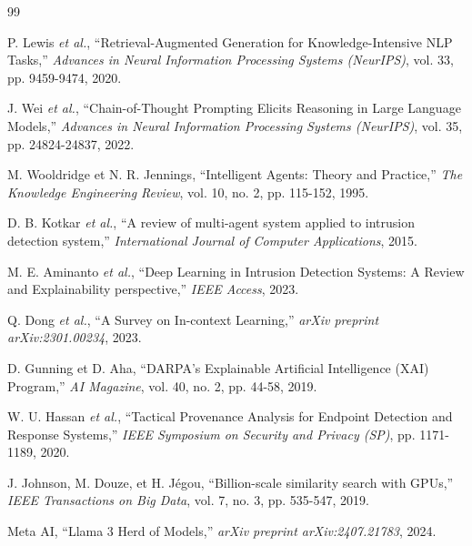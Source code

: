 \documentclass[a4paper, 12pt]{report}
\begin{document}
\begin{thebibliography}{99}


P. Lewis \textit{et al.}, ``Retrieval-Augmented Generation for Knowledge-Intensive NLP Tasks,'' \textit{Advances in Neural Information Processing Systems (NeurIPS)}, vol. 33, pp. 9459-9474, 2020.

J. Wei \textit{et al.}, ``Chain-of-Thought Prompting Elicits Reasoning in Large Language Models,'' \textit{Advances in Neural Information Processing Systems (NeurIPS)}, vol. 35, pp. 24824-24837, 2022.

M. Wooldridge et N. R. Jennings, ``Intelligent Agents: Theory and Practice,'' \textit{The Knowledge Engineering Review}, vol. 10, no. 2, pp. 115-152, 1995.

D. B. Kotkar \textit{et al.}, ``A review of multi-agent system applied to intrusion detection system,'' \textit{International Journal of Computer Applications}, 2015.

M. E. Aminanto \textit{et al.}, ``Deep Learning in Intrusion Detection Systems: A Review and Explainability perspective,'' \textit{IEEE Access}, 2023.

Q. Dong \textit{et al.}, ``A Survey on In-context Learning,'' \textit{arXiv preprint arXiv:2301.00234}, 2023.

D. Gunning et D. Aha, ``DARPA’s Explainable Artificial Intelligence (XAI) Program,'' \textit{AI Magazine}, vol. 40, no. 2, pp. 44-58, 2019.

W. U. Hassan \textit{et al.}, ``Tactical Provenance Analysis for Endpoint Detection and Response Systems,'' \textit{IEEE Symposium on Security and Privacy (SP)}, pp. 1171-1189, 2020.

J. Johnson, M. Douze, et H. Jégou, ``Billion-scale similarity search with GPUs,'' \textit{IEEE Transactions on Big Data}, vol. 7, no. 3, pp. 535-547, 2019.

Meta AI, ``Llama 3 Herd of Models,'' \textit{arXiv preprint arXiv:2407.21783}, 2024.



\end{thebibliography}
\end{document}
